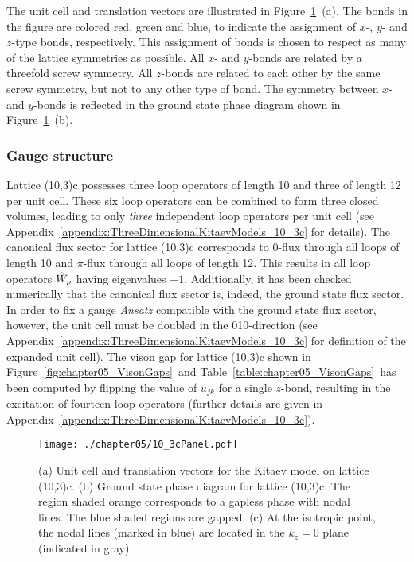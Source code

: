 The unit cell and translation vectors are illustrated in Figure~\ref{fig:chapter05_10_3cPanel}~(a).
The bonds in the figure are colored red, green and blue, to indicate the assignment of $x$-, $y$- and $z$-type bonds, respectively.
This assignment of bonds is chosen to respect as many of the lattice symmetries as possible.
All $x$- and $y$-bonds are related by a threefold screw symmetry.
All $z$-bonds are related to each other by the same screw symmetry, but not to any other type of bond.
The symmetry between $x$- and $y$-bonds is reflected in the ground state phase diagram shown in Figure~\ref{fig:chapter05_10_3cPanel}~(b).


%
%
\subsubsection{Gauge structure}
%
%
Lattice (10,3)c possesses three loop operators of length 10 and three of length 12 per unit cell.
These six loop operators can be combined to form three closed volumes, leading to only \textit{three} independent loop operators per unit cell (see Appendix~\ref{appendix:ThreeDimensionalKitaevModels_10_3c} for details).
The canonical flux sector for lattice (10,3)c corresponds to $0$-flux through all loops of length 10 and $\pi$-flux through all loops of length 12.
This results in all loop operators $\hat{W}_p$ having eigenvalues $+1$.
Additionally, it has been checked numerically that the canonical flux sector is, indeed, the ground state flux sector.
In order to fix a gauge \textit{Ansatz} compatible with the ground state flux sector, however, the unit cell must be doubled in the 010-direction (see Appendix~\ref{appendix:ThreeDimensionalKitaevModels_10_3c} for definition of the expanded unit cell).
The vison gap for lattice (10,3)c shown in Figure~\ref{fig:chapter05_VisonGaps}~and Table~\ref{table:chapter05_VisonGaps}~has been computed by flipping the value of $u_{jk}$ for a single $z$-bond, resulting in the excitation of fourteen loop operators (further details are given in Appendix~\ref{appendix:ThreeDimensionalKitaevModels_10_3c}).
%
\begin{figure}[tb]
	\centering
	\texttt{[image: ./chapter05/10\_3cPanel.pdf]}
	\caption{
		(a) Unit cell and translation vectors for the Kitaev model on lattice (10,3)c.
		(b) Ground state phase diagram for lattice (10,3)c.
		The region shaded orange corresponds to a gapless phase with nodal lines.
		The blue shaded regions are gapped.
		(c) At the isotropic point, the nodal lines (marked in blue) are located in the $k_z = 0$ plane (indicated in gray).
	}
	\label{fig:chapter05_10_3cPanel}
\end{figure}
%


